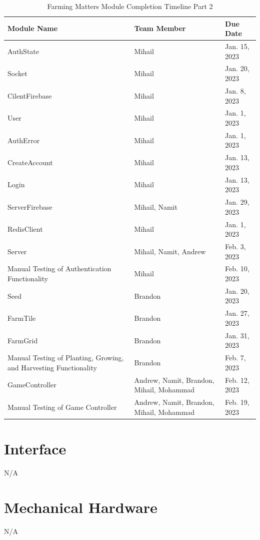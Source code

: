 \documentclass[12pt, titlepage]{article}
\begin{document}
\begin{table}[H]
\centering
\begin{tabular}{p{} p{}  p{}}
\toprule
Module Name & Team Member & Due Date \\
\midrule
AuthState & Mihail & Jan. 15, 2023\\
Socket & Mihail & Jan. 20, 2023\\
CilentFirebase & Mihail & Jan. 8, 2023\\
User & Mihail & Jan. 1, 2023\\
AuthError & Mihail & Jan. 1, 2023 \\
CreateAccount & Mihail & Jan. 13, 2023 \\
Login & Mihail & Jan. 13, 2023 \\
ServerFirebase & Mihail, Namit &  Jan. 29, 2023\\
RedisClient & Mihail & Jan. 1, 2023\\
Server & Mihail, Namit, Andrew & Feb. 3, 2023\\
Manual Testing of Authentication Functionality & Mihail & Feb. 10, 2023\\ 
Seed & Brandon & Jan. 20, 2023\\
FarmTile & Brandon & Jan. 27, 2023\\
FarmGrid & Brandon & Jan. 31, 2023\\
Manual Testing of Planting, Growing, and Harvesting Functionality & Brandon & Feb. 7, 2023\\ 
GameController & Andrew, Namit, Brandon, Mihail, Mohammad & Feb. 12, 2023 \\
Manual Testing of Game Controller & Andrew, Namit, Brandon, Mihail, Mohammad & Feb. 19, 2023\\ 
\end{tabular}
\caption{Farming Matters Module Completion Timeline Part 2}
\label{TblMH}
\end{table}


% 

\newpage{}

\appendix

\section{Interface}
N/A

\section{Mechanical Hardware}
N/A
\end{document}
